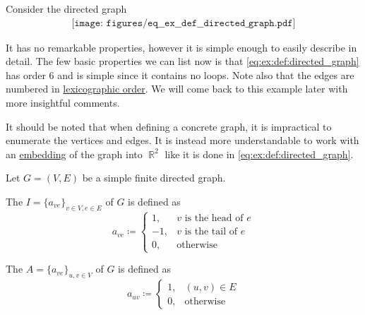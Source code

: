 \begin{example}\label{ex:def:directed_graph/basics}
  Consider the directed graph
  \begin{equation}\label{eq:ex:def:directed_graph}
    \begin{aligned}
      \texttt{[image: figures/eq\_\_ex\_\_def\_\_directed\_graph.pdf]}
    \end{aligned}
  \end{equation}

  It has no remarkable properties, however it is simple enough to easily describe in detail. The few basic properties we can list now is that \eqref{eq:ex:def:directed_graph} has order \( 6 \) and is simple since it contains no loops. Note also that the edges are numbered in \hyperref[eq:def:lexicographic_order]{lexicographic order}. We will come back to this example later with more insightful comments.

  It should be noted that when defining a concrete graph, it is impractical to enumerate the vertices and edges. It is instead more understandable to work with an \hyperref[def:graph_embedding]{embedding} of the graph into \( \BbbR^2 \) like it is done in \eqref{eq:ex:def:directed_graph}.
\end{example}

\medskip

\begin{definition}\label{def:graph_matrices}
  Let \( G = (V, E) \) be a simple finite directed graph.
  \begin{thmenum}
     The  \( I = \{ a_{ve} \}_{v \in V, e \in E} \) of \( G \) is defined as
    \begin{equation*}
      a_{ve} \coloneqq \begin{cases}
        1,  & v \text{ is the head of } e \\
        -1, & v \text{ is the tail of } e \\
        0,  & \text{otherwise}
      \end{cases}
    \end{equation*}

     The  \( A = \{ a_{ve} \}_{u, v \in V} \) of \( G \) is defined as
    \begin{equation*}
      a_{uv} \coloneqq \begin{cases}
        1, & (u, v) \in E     \\
        0, & \text{otherwise}
      \end{cases}
    \end{equation*}
  \end{thmenum}
\end{definition}


